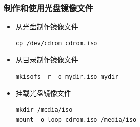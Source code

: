 \documentclass[xcolor=svgnames,presentation]{beamer}
\begin{document}
\begin{frame}[fragile]
\frametitle{制作和使用光盘镜像文件}
\label{sec-2-6}
\begin{itemize}

\item 从光盘制作镜像文件\\
\label{sec-2-6-1}%
\begin{verbatim}
cp /dev/cdrom cdrom.iso
\end{verbatim}

\item 从目录制作镜像文件\\
\label{sec-2-6-2}%
\begin{verbatim}
mkisofs -r -o mydir.iso mydir
\end{verbatim}

\item 挂载光盘镜像文件\\
\label{sec-2-6-3}%
\begin{verbatim}
mkdir /media/iso
mount -o loop cdrom.iso /media/iso
\end{verbatim}
\end{itemize} %
\end{frame}
\end{document}
